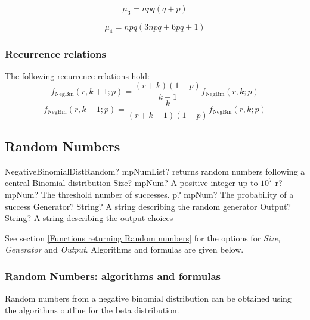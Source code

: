 \begin{equation} 
	\mu_3 = npq(q+p)
\end{equation}

\begin{equation} 
	\mu_4 = npq(3npq+6pq+1)
\end{equation}



\subsubsection{Recurrence relations}
The following recurrence relations hold:
\begin{equation} 
	f_{\text{NegBin}}(r, k+1; p) = \frac{(r+k)(1-p)}{k+1} f_{\text{NegBin}}(r, k; p)
\end{equation}
\begin{equation} 
	f_{\text{NegBin}}(r, k-1; p) = \frac{k}{(r+k-1)(1-p)} f_{\text{NegBin}}(r, k; p)
\end{equation}



\subsection{Random Numbers}

\begin{mpFunctionsExtract}
	\mpFunctionFive
	{NegativeBinomialDistRandom? mpNumList? returns random numbers following a central Binomial-distribution}
	{Size? mpNum? A positive integer up to $10^7$}
	{r? mpNum? The threshold number of successes.}
	{p? mpNum? The probability of a success}
	{Generator? String? A string describing the random generator}
	{Output? String? A string describing the output choices}
\end{mpFunctionsExtract}

\vspace{0.3cm}

See section \ref{Functions returning Random numbers} for the options for  {\itshape\sffamily Size},  {\itshape\sffamily Generator} and {\itshape\sffamily Output}. Algorithms and formulas are given below.

\subsubsection{Random Numbers: algorithms and formulas}
Random numbers from a negative binomial distribution can be obtained using the algorithms outline for the beta distribution.




